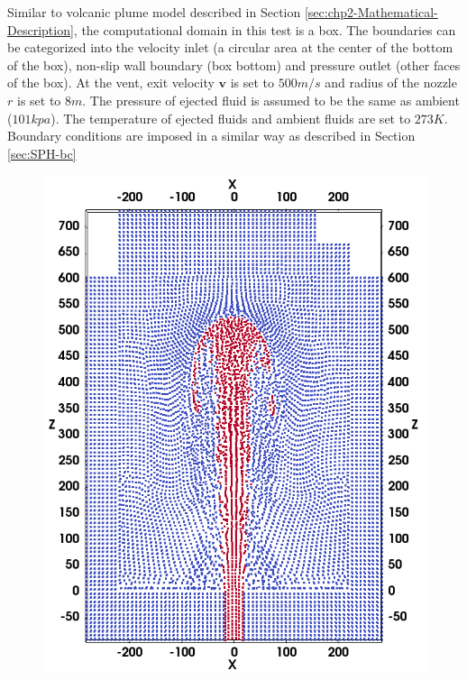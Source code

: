 Similar to volcanic plume model described in Section \ref{sec:chp2-Mathematical-Description}, the computational domain in this test is a box. The boundaries can be categorized into the velocity inlet (a circular area at the center of the bottom of the box), non-slip wall boundary (box bottom) and pressure outlet (other faces of the box).
At the vent, exit velocity $\textbf{v}$ is set to $500 m / s$ and radius of the nozzle $r$ is set to $8m $. The pressure of ejected fluid is assumed to be the same as ambient ($101 kpa$). The temperature of ejected fluids and ambient fluids are set to $273 K$. 
Boundary conditions are imposed in a similar way as described in Section \ref{sec:SPH-bc}

\begin{figure}
    \centering
    \begin{minipage}[t]{.325\textwidth}
        \centering
        \includegraphics[width=0.99 \textwidth]{./Chapter-4/Figures/SPH-alf2-t3-cutView}
    \end{minipage}%
    \begin{minipage}[t]{.325 \textwidth}

\end{minipage}
\end{figure}
